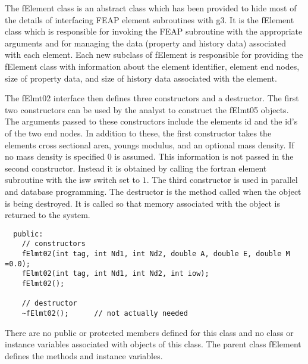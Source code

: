 \documentclass[12pt]{article}
\begin{document}
The fElement class is an abstract
class which has been provided to hide most of the details of
interfacing FEAP element subroutines with g3. It is the fElement class
which is responsible for invoking the FEAP subroutine with the
appropriate arguments and for managing the data (property and history
data) associated with each element. Each new subclass of fElement is
responsible for providing the fElement class with information about
the element identifier, element end nodes, size of property data, and
size of history data associated with the element.

The fElmt02 interface then defines three constructors and a destructor. The
first two constructors can be used by the analyst to construct the
fElmt05 objects. The arguments passed to these constructors include
the elements id and the id's of the two end nodes. In addition to
these, the first constructor takes the elements cross sectional area,
youngs modulus, and an optional mass density. If no mass density is
specified $0$ is assumed. This information is not passed in the second 
constructor. Instead it is obtained by calling the fortran element
subroutine with the isw switch set to $1$. The third
constructor is used in parallel and database programming. The
destructor is the method called when the object is being destroyed. It
is called so that memory associated with the object is returned to the
system.  

{\sf\small \begin{verbatim}
  public:
    // constructors
    fElmt02(int tag, int Nd1, int Nd2, double A, double E, double M =0.0);
    fElmt02(int tag, int Nd1, int Nd2, int iow);
    fElmt02();    

    // destructor
    ~fElmt02();      // not actually needed
\end{verbatim} }

There are no public or protected members defined for this class and no
class or instance variables associated with objects of this class. The
parent class fElement defines the methods and instance variables.
\end{document}
